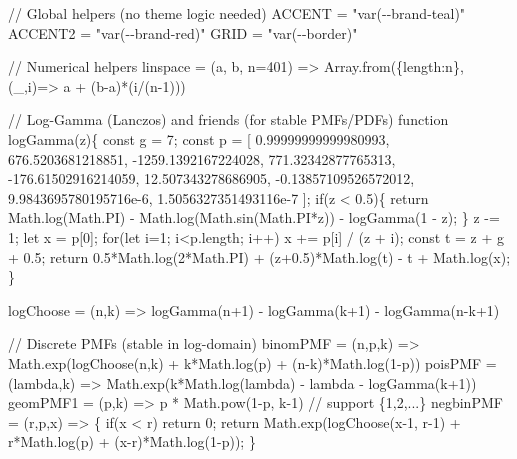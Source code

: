 \documentclass[
  letterpaper,
  DIV=11,
  numbers=noendperiod]{scrreprt}
\newenvironment{Shaded}{\begin{snugshade}}{\end{snugshade}}
\newcommand{\NormalTok}[1]{\textcolor[rgb]{0.00,0.23,0.31}{#1}}
\theoremstyle{definition}
\theoremstyle{plain}
\theoremstyle{definition}
\theoremstyle{remark}
\begin{document}
\begin{Shaded}
\begin{Highlighting}[]
\NormalTok{// Global helpers (no theme logic needed)}
\NormalTok{ACCENT  = "var({-}{-}brand{-}teal)"}
\NormalTok{ACCENT2 = "var({-}{-}brand{-}red)"}
\NormalTok{GRID    = "var({-}{-}border)"}

\NormalTok{// Numerical helpers}
\NormalTok{linspace = (a, b, n=401) =\textgreater{} Array.from(\{length:n\}, (\_,i)=\textgreater{} a + (b{-}a)*(i/(n{-}1)))}

\NormalTok{// Log{-}Gamma (Lanczos) and friends (for stable PMFs/PDFs)}
\NormalTok{function logGamma(z)\{}
\NormalTok{  const g = 7;}
\NormalTok{  const p = [}
\NormalTok{    0.99999999999980993, 676.5203681218851, {-}1259.1392167224028,}
\NormalTok{    771.32342877765313, {-}176.61502916214059, 12.507343278686905,}
\NormalTok{    {-}0.13857109526572012, 9.9843695780195716e{-}6, 1.5056327351493116e{-}7}
\NormalTok{  ];}
\NormalTok{  if(z \textless{} 0.5)\{}
\NormalTok{    return Math.log(Math.PI) {-} Math.log(Math.sin(Math.PI*z)) {-} logGamma(1 {-} z);}
\NormalTok{  \}}
\NormalTok{  z {-}= 1;}
\NormalTok{  let x = p[0];}
\NormalTok{  for(let i=1; i\textless{}p.length; i++) x += p[i] / (z + i);}
\NormalTok{  const t = z + g + 0.5;}
\NormalTok{  return 0.5*Math.log(2*Math.PI) + (z+0.5)*Math.log(t) {-} t + Math.log(x);}
\NormalTok{\}}

\NormalTok{logChoose = (n,k) =\textgreater{} logGamma(n+1) {-} logGamma(k+1) {-} logGamma(n{-}k+1)}

\NormalTok{// Discrete PMFs (stable in log{-}domain)}
\NormalTok{binomPMF = (n,p,k) =\textgreater{} Math.exp(logChoose(n,k) + k*Math.log(p) + (n{-}k)*Math.log(1{-}p))}
\NormalTok{poisPMF  = (lambda,k) =\textgreater{} Math.exp(k*Math.log(lambda) {-} lambda {-} logGamma(k+1))}
\NormalTok{geomPMF1 = (p,k) =\textgreater{} p * Math.pow(1{-}p, k{-}1) // support \{1,2,...\}}
\NormalTok{negbinPMF = (r,p,x) =\textgreater{} \{}
\NormalTok{  if(x \textless{} r) return 0;}
\NormalTok{  return Math.exp(logChoose(x{-}1, r{-}1) + r*Math.log(p) + (x{-}r)*Math.log(1{-}p));}
\NormalTok{\}}


\end{Highlighting}
\end{Shaded}
\end{document}
